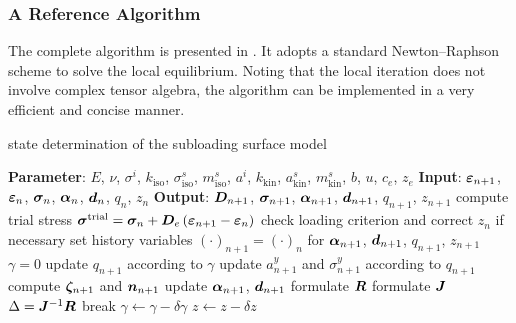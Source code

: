\subsubsection{A Reference Algorithm}
The complete algorithm is presented in .
It adopts a standard Newton--Raphson scheme to solve the local equilibrium.
Noting that the local iteration does not involve complex tensor algebra, the algorithm can be implemented in a very efficient and concise manner.
\begin{breakablealgorithm}
    \caption{state determination of the subloading surface model}\label{algo:subloading_steel}
    \begin{algorithmic}
        \State \textbf{Parameter}: $E$, $\nu$, $\sigma^i$, $k_\text{iso}$, $\sigma^s_\text{iso}$, $m^s_\text{iso}$, $a^i$, $k_\text{kin}$, $a^s_\text{kin}$, $m^s_\text{kin}$, $b$, $u$, $c_e$, $z_e$
        \State \textbf{Input}: $\bm{\varepsilon}_{n+1}$, $\bm{\varepsilon}_n$, $\bm{\sigma}_n$, $\bm{\alpha}_{n}$, $\bm{d}_n$, $q_n$, $z_n$
        \State \textbf{Output}: $\bm{D}_{n+1}$, $\bm{\sigma}_{n+1}$, $\bm{\alpha}_{n+1}$, $\bm{d}_{n+1}$, $q_{n+1}$, $z_{n+1}$
        \State compute trial stress $\bm{\sigma}^\text{trial}=\bm{\sigma}_n+\bm{D}_e\left(\bm{\varepsilon}_{n+1}-\bm{\varepsilon}_n\right)$
        \State check loading criterion and correct $z_n$ if necessary
        \State set history variables $\left(\cdot\right)_{n+1}=\left(\cdot\right)_{n}$ for $\bm{\alpha}_{n+1}$, $\bm{d}_{n+1}$, $q_{n+1}$, $z_{n+1}$
        \State $\gamma=0$
        \State update $q_{n+1}$ according to $\gamma$
        \State update $a^y_{n+1}$ and $\sigma^y_{n+1}$ according to $q_{n+1}$
        \State compute $\bm{\zeta}_{n+1}$ and $\bm{n}_{n+1}$
        \State update $\bm{\alpha}_{n+1}$, $\bm{d}_{n+1}$
        \State formulate $\bm{R}$
        \State formulate $\bm{J}$
        \State $\Delta=\bm{J}^{-1}\bm{R}$
        \State break
        \EndIf
        \State $\gamma\leftarrow\gamma-\delta\gamma$
        \State $z\leftarrow{}z-\delta{}z$

\end{algorithmic}
\end{breakablealgorithm}
